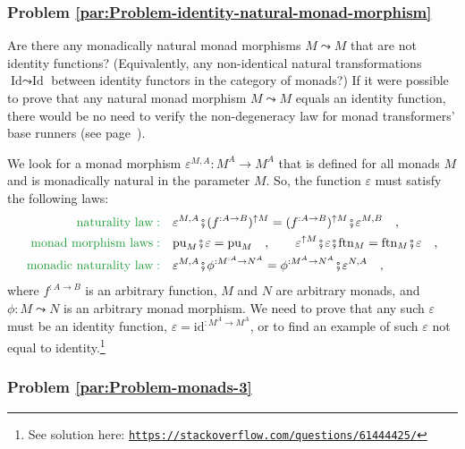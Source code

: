 \subsubsection{Problem \label{par:Problem-identity-natural-monad-morphism}\ref{par:Problem-identity-natural-monad-morphism}}

Are there any monadically natural monad morphisms $M\leadsto M$ that
are not identity functions? (Equivalently, any non-identical natural
transformations $\text{Id}\leadsto\text{Id}$ between identity functors
in the category of monads?) If it were possible to prove that any
natural monad morphism $M\leadsto M$ equals an identity function,
there would be no need to verify the non-degeneracy law for monad
transformers\textsf{'} base runners (see page~\pageref{par:Open-question-monad-id-trans}).

We look for a monad morphism $\varepsilon^{M,A}:M^{A}\rightarrow M^{A}$
that is defined for all monads $M$ and is monadically natural in
the parameter $M$. So, the function $\varepsilon$ must satisfy the
following laws:
\begin{align*}
{\color{greenunder}\text{naturality law}:}\quad & \varepsilon^{M,A}\bef(f^{:A\rightarrow B})^{\uparrow M}=(f^{:A\rightarrow B})^{\uparrow M}\bef\varepsilon^{M,B}\quad,\\
{\color{greenunder}\text{monad morphism laws}:}\quad & \text{pu}_{M}\bef\varepsilon=\text{pu}_{M}\quad,\quad\quad\varepsilon^{\uparrow M}\bef\varepsilon\bef\text{ftn}_{M}=\text{ftn}_{M}\bef\varepsilon\quad,\\
{\color{greenunder}\text{monadic naturality law}:}\quad & \varepsilon^{M,A}\bef\phi^{:M^{:A}\rightarrow N^{A}}=\phi^{:M^{A}\rightarrow N^{A}}\bef\varepsilon^{N,A}\quad,
\end{align*}
where $f^{:A\rightarrow B}$ is an arbitrary function, $M$ and $N$
are arbitrary monads, and $\phi:M\leadsto N$ is an arbitrary monad
morphism. We need to prove that any such $\varepsilon$ must be an
identity function, $\varepsilon=\text{id}^{:M^{A}\rightarrow M^{A}}$,
or to find an example of such $\varepsilon$ not equal to identity.\footnote{See solution here: \texttt{\href{https://stackoverflow.com/questions/61444425/}{https://stackoverflow.com/questions/61444425/}}}

\subsubsection{Problem \label{par:Problem-monads-3}\ref{par:Problem-monads-3}}

